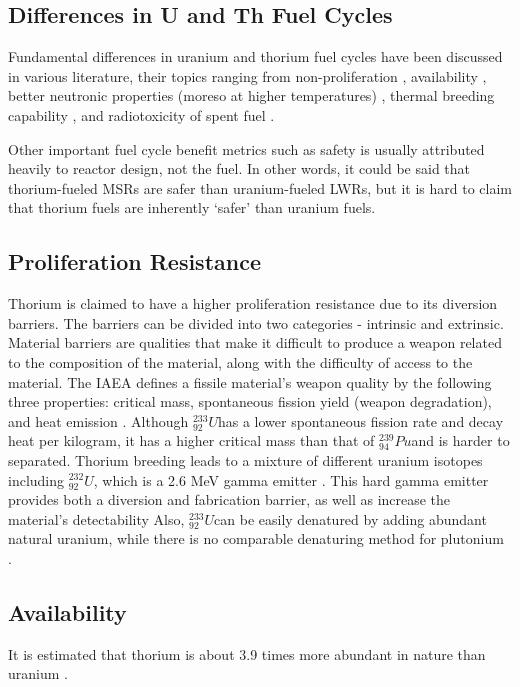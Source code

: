 \documentclass{article}
\newcommand{\uthree}{$^{233}_{92}U$}
\newcommand{\utwo}{$^{232}_{92}U$}
\newcommand{\pu}{$^{239}_{94}Pu$}
\begin{document}
\subsection{Differences in U and Th Fuel Cycles}
Fundamental differences in uranium and thorium fuel
cycles have been discussed in various literature,
their topics ranging from 
non-proliferation
\cite{iaea_thorium_2005} 
\cite{moir_recommendations_2008} 
\cite{kang_u-232_2001} %
,
availability
\cite{herring_uranium_2013}
,
better neutronic properties (moreso at higher temperatures)
\cite{lung_perspectives_1998}
,
thermal breeding capability
\cite{robertson_conceptual_1971}
,
and 
radiotoxicity of spent fuel
\cite{croff_comparative_2016}
.


Other important fuel cycle benefit metrics
such as safety is usually attributed heavily
to reactor design, not the fuel. In other words,
it could be said that thorium-fueled \glspl{MSR} are safer
than uranium-fueled \glspl{LWR}, but it is hard to claim
that thorium fuels are inherently `safer' than uranium fuels.


\subsection{Proliferation Resistance}
Thorium is claimed to have a higher proliferation resistance
due to its diversion barriers. The barriers can be divided into
two categories - intrinsic and extrinsic. Material barriers
are qualities that make it difficult to produce a weapon related
to the composition of the material, along with the difficulty of
access to the material. The IAEA defines a fissile material's weapon
quality by the following three properties: critical mass, spontaneous 
fission yield (weapon degradation), and heat emission \cite{iaea_thorium_2005}.
Although \uthree has a lower spontaneous fission rate and decay heat per kilogram,
it has a higher critical mass than that of \pu and is harder to separated.
Thorium breeding leads to a mixture of different uranium isotopes including
\utwo, which is a 2.6 MeV gamma emitter \cite{moir_recommendations_2008}. This hard gamma emitter provides
both a diversion and fabrication barrier, as well as increase the material's detectability
Also, \uthree can be easily denatured by adding abundant natural uranium, while
there is no comparable denaturing method for plutonium \cite{kang_u-232_2001}.


\subsection{Availability}
It is estimated that thorium is about 3.9 times more abundant in
nature than uranium \cite{herring_uranium_2013}. 
\end{document}
